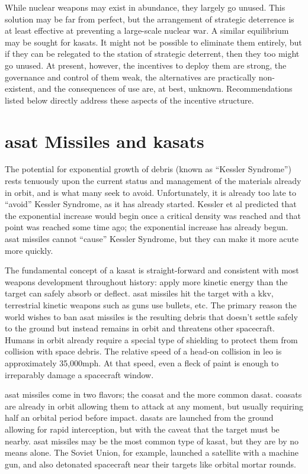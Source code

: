 While nuclear weapons may exist in abundance, they largely go unused.
This solution may be far from perfect, but the arrangement of
strategic deterrence is at least effective at preventing a large-scale
nuclear war.  A similar equilibrium may be sought for \acp{kasat}.  It
might not be possible to eliminate them entirely, but if they can be
relegated to the station of strategic deterrent, then they too might
go unused.  At present, however, the incentives to deploy them are
strong, the governance and control of them weak, the alternatives are
practically non-existent, and the consequences of use are, at best,
unknown.  Recommendations listed below directly address these aspects
of the incentive structure.

\section*{\ac{asat} Missiles and \acfp{kasat}}

The potential for exponential growth of debris (known as ``Kessler
Syndrome'') rests tenuously upon the current status and management of
the materials already in orbit, and is what many seek to avoid.
Unfortunately, it is already too late to ``avoid'' Kessler Syndrome,
as it has already started.  Kessler et al predicted that the
exponential increase would begin once a critical density was reached
and that point was reached some time ago; the exponential increase has
already begun.\cite[p14]{kessler-reunion} \ac{asat} missiles cannot
``cause'' Kessler Syndrome, but they can make it more acute more
quickly.\cite[p10]{kessler-reunion}

The fundamental concept of a \ac{kasat} is straight-forward and
consistent with most weapons development throughout history: apply
more kinetic energy than the target can safely absorb or deflect.
\ac{asat} missiles hit the target with a \ac{kkv}, terrestrial kinetic
weapons such as guns use bullets, etc.  The primary reason the world
wishes to ban \ac{asat} missiles is the resulting debris that doesn't
settle safely to the ground but instead remains in orbit and threatens
other spacecraft.  Humans in orbit already require a special type of
shielding to protect them from collision with space
debris.\cite{whipple-me-spacecraft} The relative speed of a head-on
collision in \ac{leo} is approximately 35,000mph.  At that speed, even
a fleck of paint is enough to irreparably damage a spacecraft
window.\cite{iss-throwing-stones}

\ac{asat} missiles come in two flavors; the \acf{coasat} and the more
common \acf{dasat}.\cite{brian} \acp{coasat} are already in orbit
allowing them to attack at any moment, but usually requiring half an
orbital period before impact.\cite{brian} \acp{dasat} are launched
from the ground allowing for rapid interception, but with the caveat
that the target must be nearby.\cite{grego} \ac{asat} missiles may be
the most common type of \ac{kasat}, but they are by no means alone.
The Soviet Union, for example, launched a satellite with a machine
gun, and also detonated spacecraft near their targets like orbital
mortar rounds.\cite{brian}

